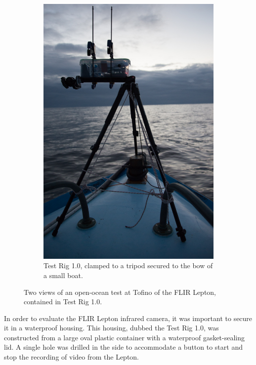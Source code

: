 \begin{figure}[h]
\begin{subfigure}{.35\textwidth}
  \includegraphics[width=.95\linewidth]{"./image/20150219-_BEN2655"}
  \caption{Test Rig 1.0, clamped to a tripod secured to the bow of a small boat.}
  \label{fig:test_rig_1.0_tofino:sub2}
\end{subfigure}
\caption[Test Rig 1.0 open-ocean test.]{Two views of an open-ocean test at Tofino of the FLIR Lepton, contained in Test Rig 1.0.}
\label{fig:test_rig_1.0_tofino}
\end{figure}

In order to evaluate the FLIR Lepton infrared camera, it was important to secure it in a waterproof housing. This housing, dubbed the Test Rig 1.0, was constructed from a large oval plastic container with a waterproof gasket-sealing lid. A single hole was drilled in the side to accommodate a button to start and stop the recording of video from the Lepton.

